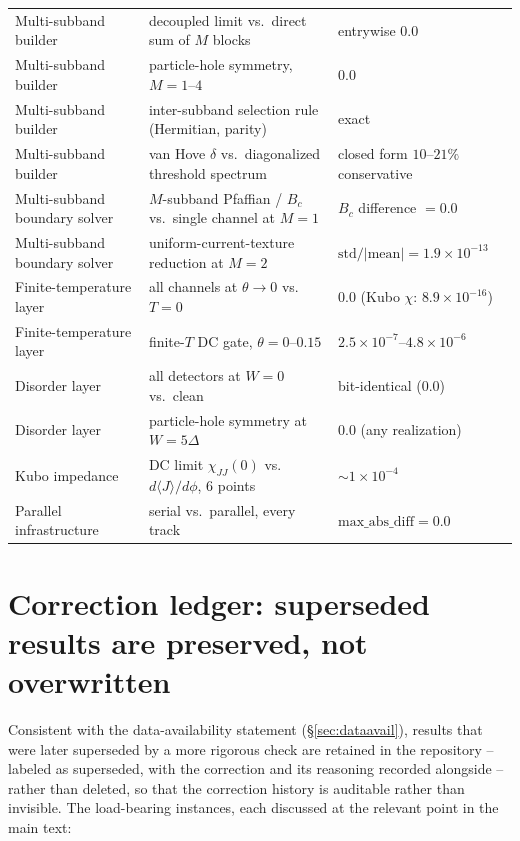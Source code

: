 \documentclass[aps,physrev,reprint,superscriptaddress,amsmath,amssymb,floatfix]{revtex4-2}
\begin{document}
\begin{table}[t]
\begin{ruledtabular}
\begin{tabular}{lll}
Multi-subband builder        & decoupled limit vs.\ direct sum of $M$ blocks             & entrywise $0.0$ \\
Multi-subband builder        & particle-hole symmetry, $M=1$--$4$                        & $0.0$ \\
Multi-subband builder        & inter-subband selection rule (Hermitian, parity)          & exact \\
Multi-subband builder        & van Hove $\delta$ vs.\ diagonalized threshold spectrum    & closed form $10$--$21\%$ conservative \\
Multi-subband boundary solver& $M$-subband Pfaffian / $B_c$ vs.\ single channel at $M=1$ & $B_c$ difference $=0.0$ \\
Multi-subband boundary solver& uniform-current-texture reduction at $M=2$                & $\mathrm{std}/|\mathrm{mean}|=1.9\times10^{-13}$ \\
Finite-temperature layer     & all channels at $\theta\to0$ vs.\ $T=0$                   & $0.0$ (Kubo $\chi$: $8.9\times10^{-16}$) \\
Finite-temperature layer     & finite-$T$ DC gate, $\theta=0$--$0.15$                     & $2.5\times10^{-7}$--$4.8\times10^{-6}$ \\
Disorder layer               & all detectors at $W=0$ vs.\ clean                         & bit-identical ($0.0$) \\
Disorder layer               & particle-hole symmetry at $W=5\Delta$                     & $0.0$ (any realization) \\
Kubo impedance               & DC limit $\chi_{JJ}(0)$ vs.\ $d\langle J\rangle/d\phi$, 6 points & $\sim1\times10^{-4}$ \\
Parallel infrastructure      & serial vs.\ parallel, every track                         & $\mathrm{max\_abs\_diff}=0.0$ \\
\end{tabular}
\end{ruledtabular}
\end{table}
\endgroup

\section{Correction ledger: superseded results are preserved, not overwritten}
\label{app:corrections}

Consistent with the data-availability statement (\S\ref{sec:dataavail}),
results that were later superseded by a more rigorous check are retained in
the repository -- labeled as superseded, with the correction and its
reasoning recorded alongside -- rather than deleted, so that the correction
history is auditable rather than invisible. The load-bearing instances,
each discussed at the relevant point in the main text:
\end{document}
